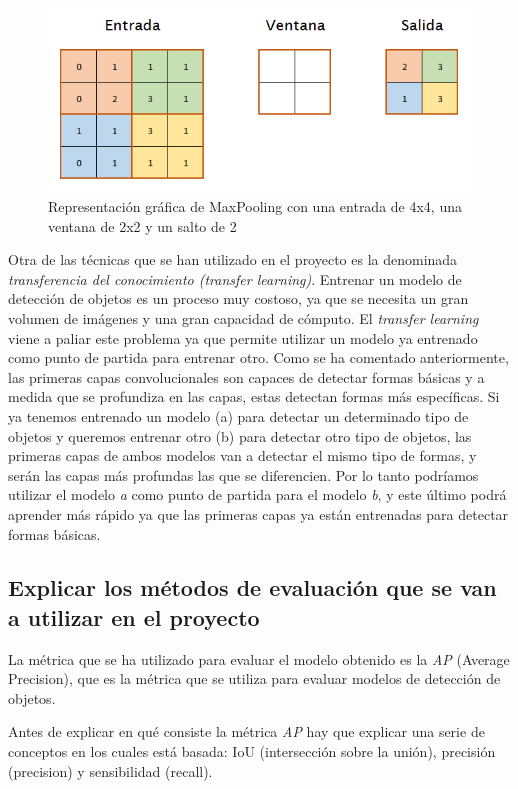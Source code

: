 \begin{figure}[H]
	\centering
	\includegraphics[width=0.7\linewidth]{images/maxpooling_example.png}
	\caption{Representación gráfica de MaxPooling con una entrada de 4x4, una ventana de 2x2 y un salto de 2}
	\label{fig:cnn_maxpooling}
\end{figure}

Otra de las técnicas que se han utilizado en el proyecto es la denominada \textit{transferencia del conocimiento (transfer learning)}. Entrenar un modelo de detección de objetos es un proceso muy costoso, ya que se necesita un gran volumen de imágenes y una gran capacidad de cómputo. El \textit{transfer learning} viene a paliar este problema ya que permite utilizar un modelo ya entrenado como punto de partida para entrenar otro. Como se ha comentado anteriormente, las primeras capas convolucionales son capaces de detectar formas básicas y a medida que se profundiza en las capas, estas detectan formas más específicas. Si ya tenemos entrenado un modelo (a) para detectar un determinado tipo de objetos y queremos entrenar otro (b) para detectar otro tipo de objetos, las primeras capas de ambos modelos van a detectar el mismo tipo de formas, y serán las capas más profundas las que se diferencien. Por lo tanto podríamos utilizar el modelo \textit{a} como punto de partida para el modelo \textit{b}, y este último podrá aprender más rápido ya que las primeras capas ya están entrenadas para detectar formas básicas.

\subsection{Explicar los métodos de evaluación que se van a utilizar en el proyecto}

La métrica que se ha utilizado para evaluar el modelo obtenido es la \textit{AP} (Average Precision), que es la métrica que se utiliza para evaluar modelos de detección de objetos.

Antes de explicar en qué consiste la métrica \textit{AP} hay que explicar una serie de conceptos en los cuales está basada: IoU (intersección sobre la unión), precisión (precision) y sensibilidad (recall).

